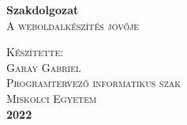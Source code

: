 \documentclass{book}
\begin{document}
\begin{titlepage}

\begin{center}
\textbf{\Huge{Szakdolgozat}}
\\
\vspace{1cm}
\textsc{\LARGE{A weboldalkészítés jövője}}

\vspace{6cm}
\textsc{\large{Készítette:}}
\\
\textsc{\large{Garay Gabriel}}
\\
\textsc{Programtervező informatikus szak}
\\
\vspace{8cm}
\textsc{\Large{Miskolci Egyetem}}
\\
\textbf{2022}
\end{center}

\end{titlepage}
\end{document}
